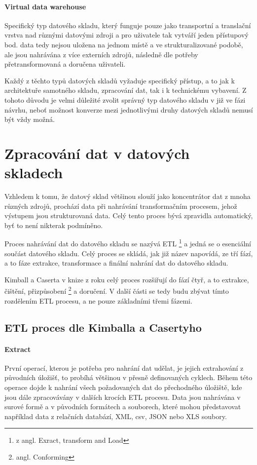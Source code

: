 \documentclass[
  digital,     %
  twoside,     %
  lof,         %
  lot,         %
]{fithesis4}
\begin{document}
\paragraph{Virtual data warehouse}
Specifický typ datového skladu, který funguje pouze jako transportní a translační vrstva nad různými datovými 
zdroji a pro uživatele tak vytváří jeden přístupový bod. data tedy nejsou uložena na jednom místě a ve strukturalizované
podobě, ale jsou nahrávána z více externích zdrojů, následně dle potřeby přetransformovaná a doručena uživateli. 

\vspace{5mm}
Každý z těchto typů datových skladů vyžaduje specifický přístup, a to jak
k architektuře samotného skladu, zpracování dat, tak i k technickému vybavení. Z tohoto
důvodu je velmi důležité zvolit správný typ datového skladu v již ve fázi návrhu, neboť
možnost konverze mezi jednotlivými druhy datových skladů nemusí být vždy možná.

\section{Zpracování dat v datových skladech}
Vzhledem k tomu, že datový sklad většinou slouží jako koncentrátor dat z mnoha různých zdrojů, prochází data při nahrávání transformačním procesem, jehož výstupem jsou strukturovaná data.
Celý tento proces bývá zpravidla automatický, byť to není nikterak podmíněno.

Proces nahrávání dat do datového skladu se nazývá ETL \footnote{z angl. Exract, transform and Load} 
a jedná se o esenciální součást datového skladu. Celý proces se skládá, jak již název
napovídá, ze tří fází, a to fáze extrakce, transformace a finální nahrání dat do datového skladu.

Kimball a Caserta v knize  z roku \citeyear{Kimballc2004} celý proces rozšiřují do fází čtyř, a to extrakce, čištění, přizpůsobení \footnote{angl. Conforming}
a doručení. V další části se tedy budu zbývat tímto rozdělením ETL
procesu, a ne pouze základními třemi fázemi.

\subsection{ETL proces dle Kimballa a Casertyho}
\paragraph{Extract}
První operací, kterou je potřeba pro nahrání dat udělat, je jejich extrahování
z původních úložišť, to probíhá většinou v přesně definovaných cyklech. Během této operace
dojde k nahrání všech požadovaných dat do přechodného úložiště, kde jsou dále
zpracovávány v dalších krocích ETL procesu. Data jsou nahrávána v surové formě a
v původních formátech a souborech, které mohou představovat například data z relačních
databází, XML, csv, JSON nebo XLS soubory.\parencite[s.~18]{Kimballc2004}
\end{document}
